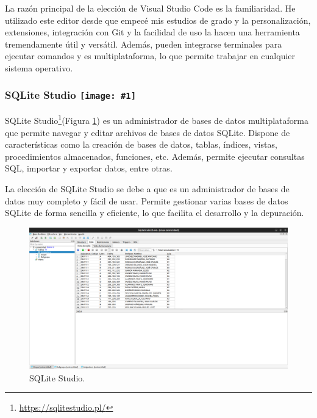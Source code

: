 La razón principal de la elección de Visual Studio Code es la familiaridad. He utilizado este editor desde que empecé mis estudios de grado y la personalización, extensiones, integración con Git y la facilidad de uso la hacen una herramienta tremendamente útil y versátil. Además, pueden integrarse terminales para ejecutar comandos y es multiplataforma, lo que permite trabajar en cualquier sistema operativo.\newline

\newpage
\renewcommand{\icon}[1]{\texttt{[image: \#1]}}
\subsubsection*{SQLite Studio \protect\icon{./imagenes/sqlite_logo.png}}

SQLite Studio\footnote{\url{https://sqlitestudio.pl/}}(Figura \ref{fig:sqlitestudio}) es un administrador de bases de datos multiplataforma que permite navegar y editar archivos de bases de datos SQLite. Dispone de características como la creación de bases de datos, tablas, índices, vistas, procedimientos almacenados, funciones, etc. Además, permite ejecutar consultas SQL, importar y exportar datos, entre otras.\newline


La elección de SQLite Studio se debe a que es un administrador de bases de datos muy completo y fácil de usar. Permite gestionar varias bases de datos SQLite de forma sencilla y eficiente, lo que facilita el desarrollo y la depuración.\newline

\begin{figure}[H]
    \centering
    \includegraphics[width=1\textwidth]{./imagenes/SQLiteStudio.png}
    \caption{SQLite Studio.}
    \label{fig:sqlitestudio}
\end{figure}

